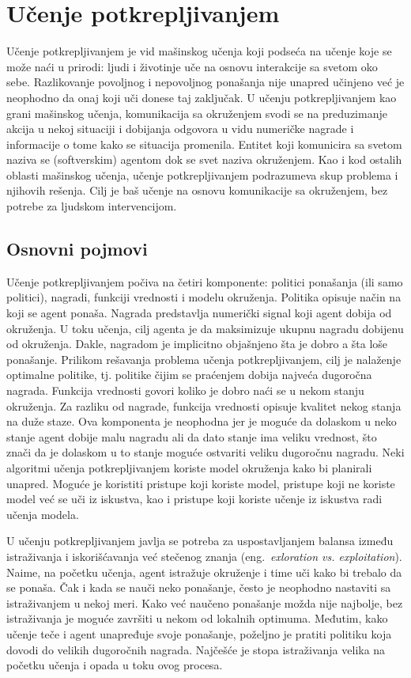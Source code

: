 \chapter{Učenje potkrepljivanjem}
\label{ch:rl}

Učenje potkrepljivanjem je vid mašinskog učenja koji podseća na učenje koje se može naći u prirodi: ljudi i životinje uče na osnovu interakcije sa svetom oko sebe. Razlikovanje povoljnog i nepovoljnog ponašanja nije unapred učinjeno već je neophodno da onaj koji uči donese taj zaključak. U učenju potkrepljivanjem kao grani mašinskog učenja, komunikacija sa okruženjem svodi se na preduzimanje akcija u nekoj situaciji i dobijanja odgovora u vidu numeričke nagrade i informacije o tome kako se situacija promenila. Entitet koji komunicira sa svetom naziva se (softverskim) agentom dok se svet naziva okruženjem. Kao i kod ostalih oblasti mašinskog učenja, učenje potkrepljivanjem podrazumeva skup problema i njihovih rešenja. Cilj je baš učenje na osnovu komunikacije sa okruženjem, bez potrebe za ljudskom intervencijom.

\section{Osnovni pojmovi}

Učenje potkrepljivanjem počiva na četiri komponente: politici ponašanja (ili samo politici), nagradi, funkciji vrednosti i modelu okruženja. Politika opisuje način na koji se agent ponaša. Nagrada predstavlja numerički signal koji agent dobija od okruženja. U toku učenja, cilj agenta je da maksimizuje ukupnu nagradu dobijenu od okruženja. Dakle, nagradom je implicitno objašnjeno šta je dobro a šta loše ponašanje. Prilikom rešavanja problema učenja potkrepljivanjem, cilj je nalaženje optimalne politike, tj. politike čijim se praćenjem dobija najveća dugoročna nagrada. Funkcija vrednosti govori koliko je dobro naći se u nekom stanju okruženja. Za razliku od nagrade, funkcija vrednosti opisuje kvalitet nekog stanja na duže staze. Ova komponenta je neophodna jer je moguće da dolaskom u neko stanje agent dobije malu nagradu ali da dato stanje ima veliku vrednost, što znači da je dolaskom u to stanje moguće ostvariti veliku dugoročnu nagradu. Neki algoritmi učenja potkrepljivanjem koriste model okruženja kako bi planirali unapred. Moguće je koristiti pristupe koji koriste model, pristupe koji ne koriste model već se uči iz iskustva, kao i pristupe koji koriste učenje iz iskustva radi učenja modela.
\par 
U učenju potkrepljivanjem javlja se potreba za uspostavljanjem balansa između istraživanja i iskorišćavanja već stečenog znanja (eng.~{\em exloration vs. exploitation}). Naime, na početku učenja, agent istražuje okruženje i time uči kako bi trebalo da se ponaša. Čak i kada se nauči neko ponašanje, često je neophodno nastaviti sa istraživanjem u nekoj meri. Kako već naučeno ponašanje možda nije najbolje, bez istraživanja je moguće završiti u nekom od lokalnih optimuma. Međutim, kako učenje teče i agent unapređuje svoje ponašanje, poželjno je pratiti politiku koja dovodi do velikih dugoročnih nagrada. Najčešće je stopa istraživanja velika na početku učenja i opada u toku ovog procesa.

